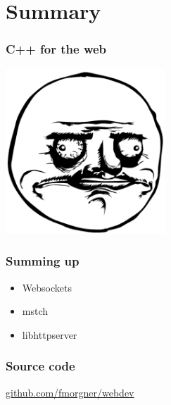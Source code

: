 \section{Summary}
\begin{frame}
  \frametitle{C++ for the web}
  \begin{center}
    \includegraphics[width=6cm]{images/gusta}
  \end{center}
\end{frame}
\begin{frame}
  \frametitle{Summing up}
  \begin{itemize}
    \item Websockets
    \item mstch
    \item libhttpserver
  \end{itemize}
\end{frame}
\begin{frame}
  \frametitle{Source code}
  \begin{center}
    \href{https://github.com/fmorgner/webdev.git}{github.com/fmorgner/webdev}
  \end{center}
\end{frame}
